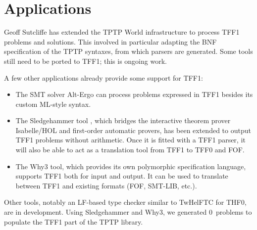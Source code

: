 \section{Applications}
\label{sec_apps}

Geoff Sutcliffe has extended the TPTP World infrastructure to process TFF1
problems and solutions. This involved in particular adapting the BNF
specification of the TPTP syntaxes, from which parsers are generated. Some tools
still need to be ported to TFF1; this is ongoing work.

A few other applications already provide some support for TFF1:
%
\begin{itemize}
\item The SMT solver Alt-Ergo \cite{bobot-et-al-2008} can process problems
expressed in TFF1 besides its custom ML-style syntax.

\item The Sledgehammer tool \cite{paulson-blanchette-2010}, which bridges the
interactive theorem prover Isabelle\slash HOL and first-order automatic provers,
has been extended to output TFF1 problems without arithmetic. Once it is fitted
with a TFF1 parser, it will also be able to act as a translation tool from TFF1
to TFF0 and FOF.

\item The Why3 \cite{bobot-et-al-2011} tool, which provides its own polymorphic
specification language, supports TFF1 both for input and output. It can be used
to translate between TFF1 and existing formats (FOF, SMT-LIB, etc.).
\end{itemize}

Other tools, notably an LF-based type checker similar to TwHelFTC for THF0,
are in development.
%
Using Sledgehammer and Why3, we generated 0~problems to populate the TFF1
part of the TPTP library.

%
%
%
%

